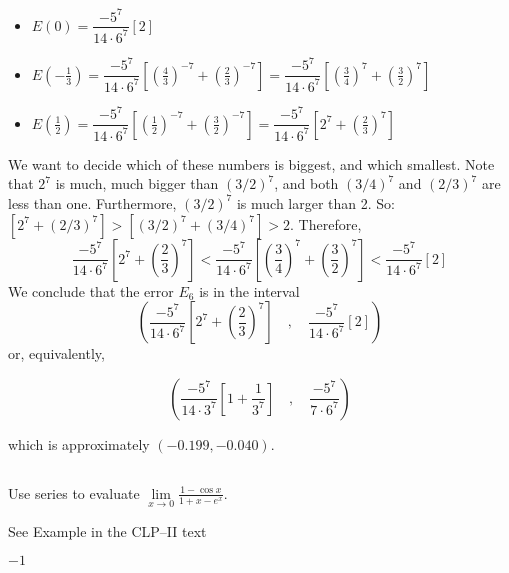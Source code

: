 \begin{solution}
\begin{itemize}
	\item $E(0)=\dfrac{-5^7}{14\cdot 6^7}[2]$
	\item $E\left(-\frac{1}{3}\right)=\dfrac{-5^7}{14\cdot 6^7}\left[\left(\frac43 \right)^{-7}+\left(\frac23 \right)^{-7} \right]=\dfrac{-5^7}{14\cdot 6^7}\left[\left(\frac34 \right)^{7}+\left(\frac32 \right)^{7} \right]$
	\item $E\left(\frac{1}{2}\right)=\dfrac{-5^7}{14\cdot 6^7}\left[\left(\frac12 \right)^{-7}+\left(\frac32 \right)^{-7} \right]=\dfrac{-5^7}{14\cdot 6^7}\left[2^7+\left(\frac23 \right)^{7} \right]$
\end{itemize}
We want to decide which of these numbers is biggest, and which smallest. Note that $2^7$ is much, much bigger than $(3/2)^7$, and both $(3/4)^7$ and $(2/3)^7$ are less than one. Furthermore, $(3/2)^7$ is much larger than 2. So: $\left[2^7+(2/3)^7\right]>\left[(3/2)^7+(3/4)^7\right]>2.$ Therefore,
\[\dfrac{-5^7}{14\cdot 6^7}\left[2^7+\left(\frac23 \right)^{7} \right]<\dfrac{-5^7}{14\cdot 6^7}\left[\left(\frac34 \right)^{7}+\left(\frac32 \right)^{7} \right]<\dfrac{-5^7}{14\cdot 6^7}[2]\]
We conclude that the error $E_6$ is in the interval
\[\left(\dfrac{-5^7}{14\cdot 6^7}\left[2^7+\left(\frac23 \right)^{7} \right]\quad,\quad \dfrac{-5^7}{14\cdot 6^7} [2]\right)\]
or, equivalently,

\[\left(\dfrac{-5^7}{14\cdot 3^7}\left[1+\frac{1}{3^7} \right]\quad,\quad \dfrac{-5^7}{7\cdot 6^7} \right)\]

which is approximately $\left(-0.199, -0.040\right)$.
\end{solution}



\subsection*{\Application}


\begin{Mquestion}[2014A]
Use series to evaluate
$\displaystyle \lim\limits_{x\rightarrow 0}\frac{1-\cos x}{1+x-e^x}$.
\end{Mquestion}

\begin{hint}
See Example  in the
CLP--II text
\end{hint}

\begin{answer}
$-1$
\end{answer}

